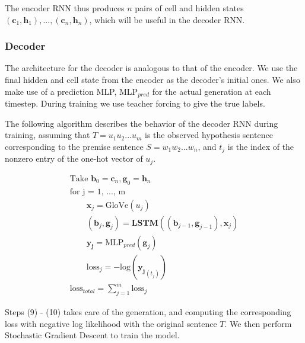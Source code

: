 \documentclass[a4paper, 12pt]{article}
\theoremstyle{definition}
\begin{document}
The encoder RNN thus produces $n$ pairs of cell and hidden states $(\mathbf{c}_1, \mathbf{h}_1), ..., (\mathbf{c}_n, \mathbf{h}_n)$, which will be useful in the decoder RNN. 

\subsubsection{Decoder}


The architecture for the decoder is analogous to that of the encoder. We use the final hidden and cell state from the encoder as the decoder's initial ones. We also make use of a prediction MLP, $\text{MLP}_{pred}$ for the actual generation at each timestep. During training we use teacher forcing to give the true labels.

\bigskip

 The following algorithm describes the behavior of the decoder RNN during training, assuming that $T = u_1u_2...u_m$ is the observed hypothesis sentence corresponding to the premise sentence $S = w_1w_2...w_n$, and $t_j$ is the index of the nonzero entry of the one-hot vector of $u_j$.

\begin{gather}
\text{Take } \mathbf{b}_0 = \mathbf{c}_n, \mathbf{g}_0 = \mathbf{h}_n \\
\text{for j = 1, ..., m} \\
	\qquad \mathbf{x}_j = \text{GloVe}(u_j)  \\
	\qquad (\mathbf{b}_{j}, \mathbf{g}_{j}) = \textbf{LSTM}((\mathbf{b}_{j-1}, \mathbf{g}_{j-1}), \mathbf{x}_{j}) \\
	\qquad\mathbf{y_j} = \text{MLP}_{pred}(\mathbf{g}_j) \\
	\qquad\text{loss}_j = -\text{log}(\mathbf{y_j}_{(t_j)}) \\
\text{loss}_{total} = \sum_{j=1}^{m}\text{loss}_j
\end{gather}

Steps (9) - (10) takes care of the generation, and computing the corresponding loss with negative log likelihood with the original sentence $T$.  We then perform Stochastic Gradient Descent to train the model.


\end{document}
